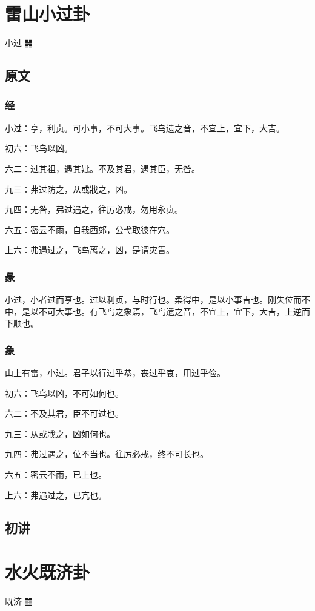 \documentclass[12pt,oneside]{book}
\begin{document}
\chapter{雷山小过卦}
小过 {\LARGE ䷽}

\section{原文}
\subsection{经}
小过：亨，利贞。可小事，不可大事。飞鸟遗之音，不宜上，宜下，大吉。

初六：飞鸟以凶。

六二：过其祖，遇其妣。不及其君，遇其臣，无咎。

九三：弗过防之，从或戕之，凶。

九四：无咎，弗过遇之，往厉必戒，勿用永贞。

六五：密云不雨，自我西郊，公弋取彼在穴。

上六：弗遇过之，飞鸟离之，凶，是谓灾眚。

\subsection{彖}
小过，小者过而亨也。过以利贞，与时行也。柔得中，是以小事吉也。刚失位而不中，是以不可大事也。有飞鸟之象焉，飞鸟遗之音，不宜上，宜下，大吉，上逆而下顺也。

\subsection{象}
山上有雷，小过。君子以行过乎恭，丧过乎哀，用过乎俭。

初六：飞鸟以凶，不可如何也。

六二：不及其君，臣不可过也。

九三：从或戕之，凶如何也。

九四：弗过遇之，位不当也。往厉必戒，终不可长也。

六五：密云不雨，已上也。

上六：弗遇过之，已亢也。

\section{初讲}



\chapter{水火既济卦}
既济 {\Large ䷾}
\end{document}
